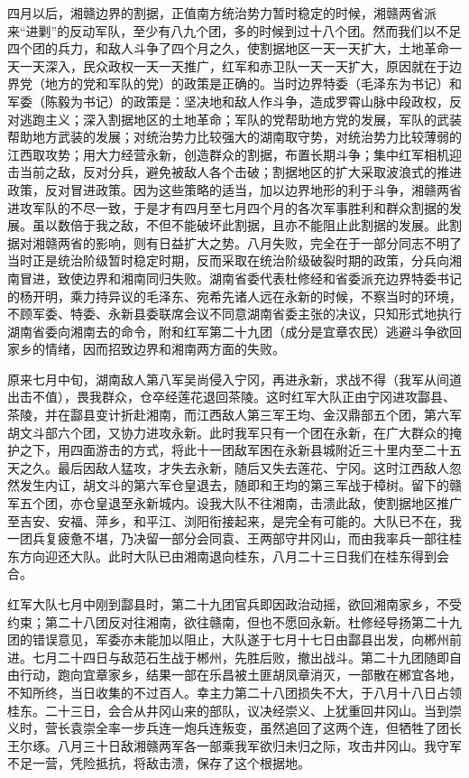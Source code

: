 四月以后，湘赣边界的割据，正值南方统治势力暂时稳定的时候，湘赣两省派来“进剿”的反动军队，至少有八九个团，多的时候到过十八个团。然而我们以不足四个团的兵力，和敌人斗争了四个月之久，使割据地区一天一天扩大，土地革命一天一天深入，民众政权一天一天推广，红军和赤卫队一天一天扩大，原因就在于边界党（地方的党和军队的党）的政策是正确的。当时边界特委（毛泽东为书记）和军委（陈毅为书记）的政策是：坚决地和敌人作斗争，造成罗霄山脉中段政权，反对逃跑主义；深入割据地区的土地革命；军队的党帮助地方党的发展，军队的武装帮助地方武装的发展；对统治势力比较强大的湖南取守势，对统治势力比较薄弱的江西取攻势；用大力经营永新，创造群众的割据，布置长期斗争；集中红军相机迎击当前之敌，反对分兵，避免被敌人各个击破；割据地区的扩大采取波浪式的推进政策，反对冒进政策。因为这些策略的适当，加以边界地形的利于斗争，湘赣两省进攻军队的不尽一致，于是才有四月至七月四个月的各次军事胜利和群众割据的发展。虽以数倍于我之敌，不但不能破坏此割据，且亦不能阻止此割据的发展。此割据对湘赣两省的影响，则有日益扩大之势。八月失败，完全在于一部分同志不明了当时正是统治阶级暂时稳定时期，反而采取在统治阶级破裂时期的政策，分兵向湘南冒进，致使边界和湘南同归失败。湖南省委代表杜修经和省委派充边界特委书记的杨开明，乘力持异议的毛泽东、宛希先诸人远在永新的时候，不察当时的环境，不顾军委、特委、永新县委联席会议不同意湖南省委主张的决议，只知形式地执行湖南省委向湘南去的命令，附和红军第二十九团（成分是宜章农民）逃避斗争欲回家乡的情绪，因而招致边界和湘南两方面的失败。

原来七月中旬，湖南敌人第八军吴尚侵入宁冈，再进永新，求战不得（我军从间道出击不值），畏我群众，仓卒经莲花退回茶陵。这时红军大队正由宁冈进攻酃县、茶陵，并在酃县变计折赴湘南，而江西敌人第三军王均、金汉鼎部五个团，第六军胡文斗部六个团，又协力进攻永新。此时我军只有一个团在永新，在广大群众的掩护之下，用四面游击的方式，将此十一团敌军困在永新县城附近三十里内至二十五天之久。最后因敌人猛攻，才失去永新，随后又失去莲花、宁冈。这时江西敌人忽然发生内讧，胡文斗的第六军仓皇退去，随即和王均的第三军战于樟树。留下的赣军五个团，亦仓皇退至永新城内。设我大队不往湘南，击溃此敌，使割据地区推广至吉安、安福、萍乡，和平江、浏阳衔接起来，是完全有可能的。大队已不在，我一团兵复疲惫不堪，乃决留一部分会同袁、王两部守井冈山，而由我率兵一部往桂东方向迎还大队。此时大队已由湘南退向桂东，八月二十三日我们在桂东得到会合。

红军大队七月中刚到酃县时，第二十九团官兵即因政治动摇，欲回湘南家乡，不受约束；第二十八团反对往湘南，欲往赣南，但也不愿回永新。杜修经导扬第二十九团的错误意见，军委亦未能加以阻止，大队遂于七月十七日由酃县出发，向郴州前进。七月二十四日与敌范石生战于郴州，先胜后败，撤出战斗。第二十九团随即自由行动，跑向宜章家乡，结果一部在乐昌被土匪胡凤章消灭，一部散在郴宜各地，不知所终，当日收集的不过百人。幸主力第二十八团损失不大，于八月十八日占领桂东。二十三日，会合从井冈山来的部队，议决经崇义、上犹重回井冈山。当到崇义时，营长袁崇全率一步兵连一炮兵连叛变，虽然追回了这两个连，但牺牲了团长王尔琢。八月三十日敌湘赣两军各一部乘我军欲归未归之际，攻击井冈山。我守军不足一营，凭险抵抗，将敌击溃，保存了这个根据地。

